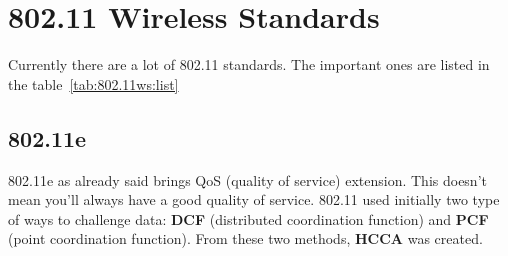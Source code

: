 \chapter{802.11 Wireless Standards}

Currently there are a lot of 802.11 standards. The important ones are listed
in the table~\ref{tab:802.11ws:list}

\begin{table}[t]
\centering
{}
\caption{List of most important 802.11 wireless standards}
\label{tab:802.11ws:list}
\end{table}

\section{802.11e}

802.11e as already said brings QoS (quality of service) extension. This doesn't
mean you'll always have a good quality of service.
802.11 used initially two type of ways to challenge data: \textbf{DCF}
(distributed coordination function) and \textbf{PCF} (point coordination
function). From these two methods, \textbf{HCCA} was created.

